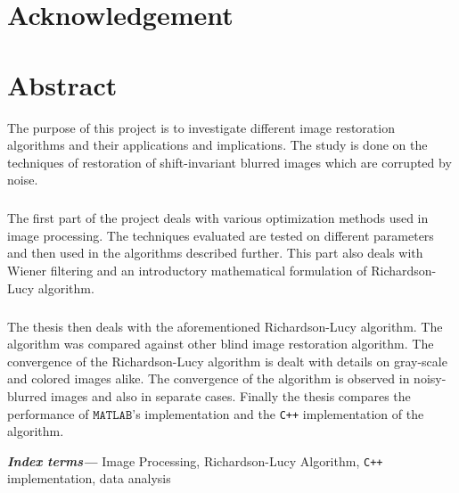 \documentclass[a4paper]{book}
\providecommand{\keywords}[1]{\textbf{\textit{Index terms---}} #1}
\begin{document}
	\captionsetup{justification=centering}
	
\frontmatter
%
\chapter[\LARGE Acknowledgement]{Acknowledgement}
\thispagestyle{empty}
\cleardoublepage
\chapter[\LARGE Abstract]{Abstract}
\thispagestyle{empty}
The purpose of this project is to investigate different image restoration algorithms and their applications and implications. The study is done on the techniques of restoration of shift-invariant blurred images which are corrupted by noise.
\paragraph*{}The first part of the project deals with various optimization methods used in image processing. The techniques evaluated are tested on different parameters and then used in the algorithms described further. This part also deals with Wiener filtering and an introductory mathematical formulation of Richardson-Lucy algorithm.
\paragraph*{}The thesis then deals with the aforementioned Richardson-Lucy algorithm. The algorithm was compared against other blind image restoration algorithm. The convergence of the Richardson-Lucy algorithm is dealt with details on gray-scale and colored images alike. The convergence of the algorithm is observed in noisy-blurred images and also in separate cases. Finally the thesis compares the performance of $  \mathtt{MATLAB}$'s implementation and the \texttt{C++} implementation of the algorithm.

\keywords{Image Processing, Richardson-Lucy Algorithm, \texttt{C++} implementation, data analysis}
\cleardoublepage

\tableofcontents
\cleardoublepage
{}
\listoffigures
\cleardoublepage
\mainmatter
\end{document}
